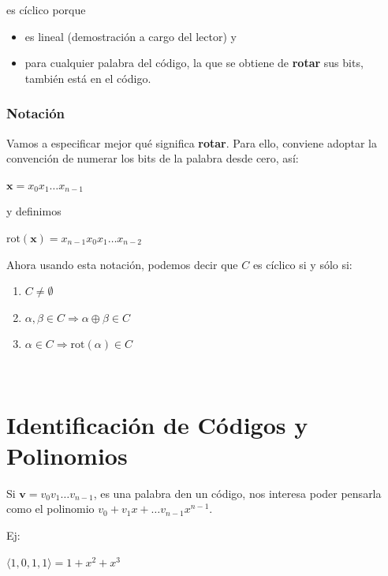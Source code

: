 \documentclass[10pt,a4paper]{article}
\begin{document}
es cíclico porque

\begin{itemize}

	\item es lineal (demostración a cargo del lector) y
	\item para cualquier palabra del código, la que se obtiene de \textbf{rotar} sus bits, también está en el código.
\end{itemize}

\subsubsection*{Notación}

Vamos a especificar mejor qué significa \textbf{rotar}. Para ello, conviene adoptar la convención de numerar los bits de la palabra desde cero, así:

\begin{center}
$\textbf{x} = x_0x_1\dots x_{n-1}$
\end{center}

y definimos

\begin{center}
$\text{rot}(\textbf{x}) = x_{n-1}x_0x_1\dots x_{n-2}$
\end{center}

Ahora usando esta notación, podemos decir que $C$ es cíclico si y sólo si:

\begin{enumerate}

	\item $C \neq \emptyset$
	\item $\alpha, \beta \in C \Rightarrow \alpha \oplus \beta \in C$
	\item $\alpha \in C \Rightarrow \text{rot}(\alpha)\in C$
\end{enumerate}

 

\section*{Identificación de Códigos y Polinomios}

Si $\textbf{v} = v_0 v_1\dots v_{n-1}$, es una palabra den un código, nos interesa poder pensarla como el polinomio $v_0 + v_1x+\dots v_{n-1}x^{n-1}$.

Ej:

\begin{center}
$\langle 1, 0, 1, 1\rangle = 1 + x^2 + x^3$
\end{center}
\end{document}
